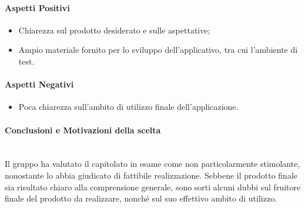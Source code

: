 \paragraph{Aspetti Positivi}
  \begin{itemize}
    \item Chiarezza sul prodotto desiderato e sulle aspettative;
    \item Ampio materiale fornito per lo sviluppo dell'applicativo, tra cui l'ambiente di test.
  \end{itemize}
\paragraph{Aspetti Negativi}
  \begin{itemize}
    \item Poca chiarezza sull'ambito di utilizzo finale dell'applicazione.
  \end{itemize}

\paragraph{Conclusioni e Motivazioni della scelta}\-\\
Il gruppo ha valutato il capitolato in esame come non particolarmente stimolante, nonostante lo abbia giudicato di fattibile realizzazione. Sebbene il prodotto finale sia risultato chiaro alla comprensione generale, sono sorti alcuni dubbi sul fruitore finale del prodotto da realizzare, nonché sul suo effettivo ambito di utilizzo.
